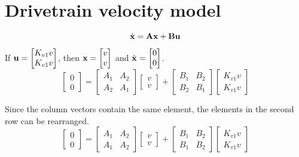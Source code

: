\section{Drivetrain velocity model}
\begin{equation*}
  \dot{\mathbf{x}} = \mathbf{A}\mathbf{x} + \mathbf{B}\mathbf{u}
\end{equation*}

If $\mathbf{u} =
\begin{bmatrix}
  K_{v1} v \\
  K_{v1} v
\end{bmatrix}$, then $\mathbf{x} =
\begin{bmatrix}
  v \\
  v
\end{bmatrix}$ and $\dot{\mathbf{x}} =
\begin{bmatrix}
  0 \\
  0
\end{bmatrix}$.
\begin{equation*}
  \begin{bmatrix}
    0 \\
    0
  \end{bmatrix} =
  \begin{bmatrix}
    A_1 & A_2 \\
    A_2 & A_1
  \end{bmatrix}
  \begin{bmatrix}
    v \\
    v
  \end{bmatrix} +
  \begin{bmatrix}
    B_1 & B_2 \\
    B_2 & B_1
  \end{bmatrix}
  \begin{bmatrix}
    K_{v1} v \\
    K_{v1} v
  \end{bmatrix}
\end{equation*}

Since the column vectors contain the same element, the elements in the second
row can be rearranged.
\begin{equation*}
  \begin{bmatrix}
    0 \\
    0
  \end{bmatrix} =
  \begin{bmatrix}
    A_1 & A_2 \\
    A_1 & A_2
  \end{bmatrix}
  \begin{bmatrix}
    v \\
    v
  \end{bmatrix} +
  \begin{bmatrix}
    B_1 & B_2 \\
    B_1 & B_2
  \end{bmatrix}
  \begin{bmatrix}
    K_{v1} v \\
    K_{v1} v
  \end{bmatrix}
\end{equation*}

